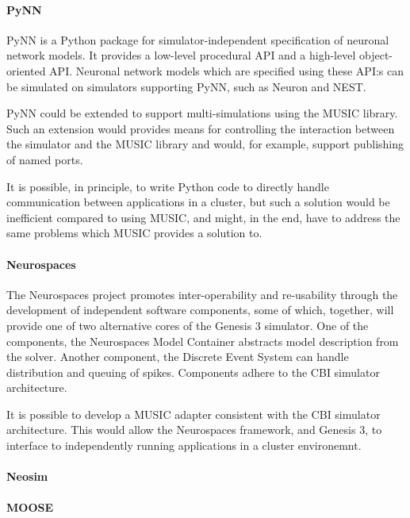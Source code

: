 \documentclass[a4paper]{report}
\begin{document}
\paragraph{PyNN}

PyNN is a Python package for simulator-independent specification of
neuronal network models.  It provides a low-level procedural API and a
high-level object-oriented API.  Neuronal network models which are
specified using these API:s can be simulated on simulators supporting
PyNN, such as Neuron and NEST.

PyNN could be extended to support multi-simulations using the MUSIC
library.  Such an extension would provides means for controlling the
interaction between the simulator and the MUSIC library and would, for
example, support publishing of named ports.

It is possible, in principle, to write Python code to directly handle
communication between applications in a cluster, but such a solution
would be inefficient compared to using MUSIC, and might, in the end,
have to address the same problems which MUSIC provides a solution to.

\paragraph{Neurospaces}

The Neurospaces project promotes inter-operability and re-usability
through the development of independent software components, some of
which, together, will provide one of two alternative cores of the
Genesis 3 simulator.  One of the components, the Neurospaces Model
Container abstracts model description from the solver.  Another
component, the Discrete Event System can handle distribution and
queuing of spikes.  Components adhere to the CBI simulator
architecture.

It is possible to develop a MUSIC adapter consistent with the CBI
simulator architecture.  This would allow the Neurospaces framework,
and Genesis 3, to interface to independently running applications in a
cluster environemnt.

\begin{metatext}
\paragraph{Neosim}

\paragraph{MOOSE}
\end{metatext}
\end{document}
